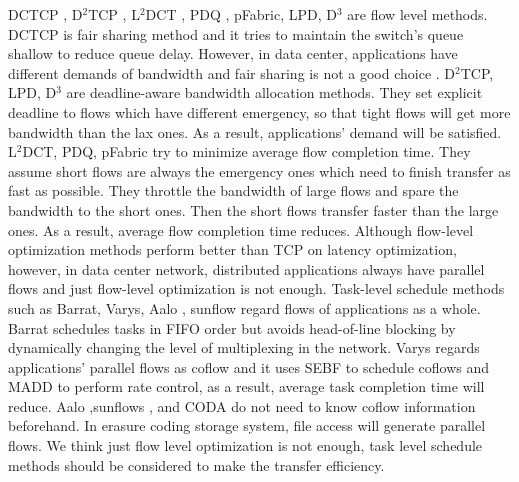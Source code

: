 \documentclass{IEEEtran}
\begin{document}
DCTCP \cite{DCTCP}, D$^2$TCP \cite{D2TCP}, L$^2$DCT \cite{L2DCT}, PDQ \cite{PDQ}, pFabric\cite{pFabric}, LPD\cite{zhang2015more},
D$^3$\cite{D3} are flow level methods.
DCTCP is fair sharing method and it tries to maintain the switch's queue shallow to reduce queue delay.
However, in data center, applications have different demands of bandwidth and fair sharing is not a good choice \cite{zhang2016fdrc}.
D$^2$TCP, LPD, D$^3$ are deadline-aware bandwidth allocation methods.
They set explicit deadline to flows which have different emergency, so that tight flows will get more bandwidth than the lax ones.
As a result, applications' demand will be satisfied.
L$^2$DCT, PDQ, pFabric try to minimize average flow completion time.
They assume short flows are always the emergency ones which need to finish transfer as fast as possible. 
They throttle the bandwidth of large flows and spare the bandwidth to the short ones. 
Then the short flows transfer faster than the large ones. 
As a result, average flow completion time reduces. 
Although flow-level optimization methods perform better than TCP on latency optimization,
however, in data center network, distributed applications always have parallel flows and just flow-level
optimization is not enough.
Task-level schedule methods such as Barrat\cite{dogar2014decentralized}, Varys\cite{chowdhury2014efficient}, Aalo \cite{chowdhury2015efficient}, sunflow\cite{huang2016sunflow} regard flows of applications as a whole.
Barrat  \cite{dogar2014decentralized} schedules tasks in FIFO order but avoids head-of-line blocking by dynamically changing the level of multiplexing in the network. 
Varys\cite{chowdhury2014efficient} regards applications'  parallel flows as coflow and it uses SEBF to schedule coflows and MADD to perform rate control, as a result, average task completion time will reduce.
Aalo \cite{chowdhury2015efficient} ,sunflows \cite{huang2016sunflow}, and CODA \cite{zhang2016coda} do not need to know coflow information beforehand. 
In erasure coding storage system, file access will generate parallel flows. We think just flow level optimization is not enough,
task level schedule methods should be considered to make the transfer efficiency.




\end{document}
